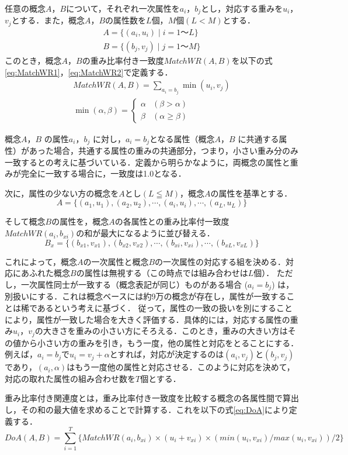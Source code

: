 \documentclass[japanese]{jnlp_1.4}
\begin{document}
任意の概念$A$，$B$について，それぞれ一次属性を$a_i$，$b_j$とし，対応する重みを$u_i$，$v_j$とする．また，概念$A$，$B$の属性数を$L$個，$M$個$(L<M)$とする．
\begin{gather*}
A=\{(a_i,u_i) \mid i=1〜L\} \\
B=\{(b_j,v_j) \mid j=1〜M\}
\end{gather*}
このとき，概念$A$，$B$の重み比率付き一致度$\mathit{MatchWR}(A,B)$を以下の式\ref{eq:MatchWR1}，\ref{eq:MatchWR2}で定義する．
\begin{gather}
 MatchWR(A,B)=\sum_{a_i=b_j}\min(u_i,v_j)\label{eq:MatchWR1} \\
 \min(\alpha,\beta)=
	\begin{cases}
	  \alpha & (\beta > \alpha) \\
	  \beta & (\alpha \geq \beta)
	\end{cases}
	\label{eq:MatchWR2}
\end{gather}

概念$A$，$B$ の属性$a_i$，$b_j$ に対し，$a_i = b_j$となる属性（概念$A$，$B$ に共通する属性）があった場合，共通する属性の重みの共通部分，つまり，小さい重み分のみ一致するとの考えに基づいている．定義から明らかなように，両概念の属性と重みが完全に一致する場合に，一致度は1.0となる．

次に，属性の少ない方の概念を$A$とし$(L \leqq M)$，概念$A$の属性を基準とする．
\[
 A=\{(a_1,u_1),(a_2,u_2),\cdots,(a_i,u_i),\cdots,(a_L,u_L)\}
\]

そして概念$B$の属性を，概念$A$の各属性との重み比率付一致度$\mathit{MatchWR}(a_i,b_{xi})$の和が最大になるように並び替える．
\[
 B_x = \{(b_{x1},v_{x1}),(b_{x2},v_{x2}),\cdots,(b_{xi},v_{xi}),\cdots,(b_{xL},v_{xL})\}
\]

これによって，概念$A$の一次属性と概念$B$の一次属性の対応する組を決める．対応にあふれた概念$B$の属性は無視する（この時点では組み合わせは$L$個）．
ただし，一次属性同士が一致する（概念表記が同じ）ものがある場合 ($a_i=b_j$) は，別扱いにする．これは概念ベースには約9万の概念が存在し，属性が一致することは稀であるという考えに基づく．
従って，属性の一致の扱いを別にすることにより，属性が一致した場合を大きく評価する．具体的には，対応する属性の重み$u_i$，$v_j$の大きさを重みの小さい方にそろえる．このとき，重みの大きい方はその値から小さい方の重みを引き，もう一度，他の属性と対応をとることにする．
例えば，$a_i=b_j$で$u_i=v_j+\alpha$とすれば，対応が決定するのは$(a_i,v_j)$と$(b_j,v_j)$であり，$(a_i,\alpha)$はもう一度他の属性と対応させる．このように対応を決めて，対応の取れた属性の組み合わせ数を$T$個とする．

重み比率付き関連度とは，重み比率付き一致度を比較する概念の各属性間で算出し，その和の最大値を求めることで計算する．これを以下の式\ref{eq:DoA}により定義する．
\begin{equation}
  DoA(A,B)=\sum_{i=1}^T\{MatchWR(a_i,b_{xi}) \times (u_i+v_{xi}) 
	\times (min(u_i,v_{xi})/max(u_i,v_{xi}))/2\}
	\label{eq:DoA}
\end{equation}
\end{document}
